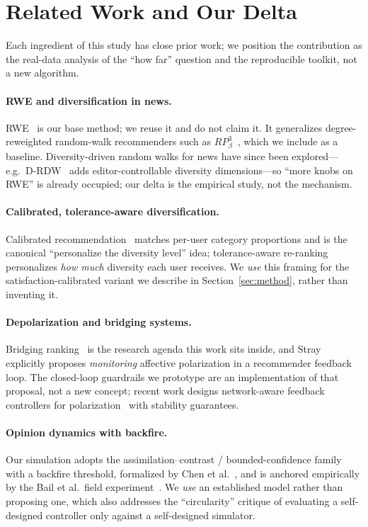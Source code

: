 \documentclass[sigconf,nonacm]{acmart}
\begin{document}
\section{Related Work and Our Delta}
\label{sec:related}
Each ingredient of this study has close prior work; we position the contribution
as the real-data analysis of the ``how far'' question and the reproducible
toolkit, not a new algorithm.

\paragraph{RWE and diversification in news.} RWE~\cite{paudel2021rwe} is our base
method; we reuse it and do not claim it. It generalizes degree-reweighted
random-walk recommenders such as $RP^3_\beta$~\cite{paudel2017rp3beta}, which we
include as a baseline. Diversity-driven random walks for news have since been
explored---e.g.\ D-RDW~\cite{drdw2025} adds editor-controllable diversity
dimensions---so ``more knobs on RWE'' is already occupied; our delta is the
empirical study, not the mechanism.

\paragraph{Calibrated, tolerance-aware diversification.} Calibrated
recommendation~\cite{steck2018calibrated} matches per-user category proportions
and is the canonical ``personalize the diversity level'' idea; tolerance-aware
re-ranking personalizes \emph{how much} diversity each user receives. We
\emph{use} this framing for the satisfaction-calibrated variant we describe in
Section~\ref{sec:method}, rather than inventing it.

\paragraph{Depolarization and bridging systems.} Bridging
ranking~\cite{stray2023bridging} is the research agenda this work sits inside, and
Stray~\cite{stray2021designing} explicitly proposes \emph{monitoring} affective
polarization in a recommender feedback loop. The closed-loop guardrails we
prototype are an implementation of that proposal, not a new concept; recent work
designs network-aware feedback controllers for
polarization~\cite{network2024polarization} with stability guarantees.

\paragraph{Opinion dynamics with backfire.} Our simulation adopts the
assimilation--contrast / bounded-confidence family with a backfire threshold,
formalized by Chen et al.~\cite{chen2021opinion}, and is anchored empirically by
the Bail et al.\ field experiment~\cite{bail2018exposure}. We \emph{use} an
established model rather than proposing one, which also addresses the
``circularity'' critique of evaluating a self-designed controller only against a
self-designed simulator.
\end{document}
